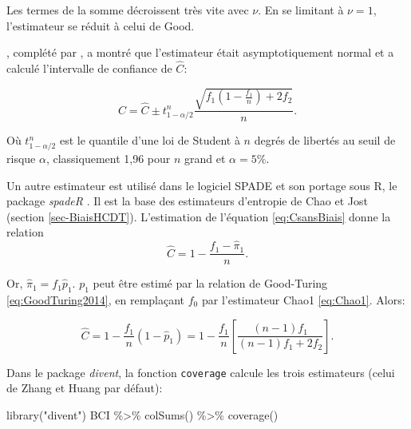 \documentclass[
  11pt,
  american,
  a4paper,
  extrafontsizes,onecolumn,openright
  ]{memoir}
\newenvironment{Shaded}{\begin{snugshade}}{\end{snugshade}}
\newcommand{\FunctionTok}[1]{\textcolor[rgb]{0.00,0.00,0.00}{#1}}
\newcommand{\NormalTok}[1]{#1}
\newcommand{\SpecialCharTok}[1]{\textcolor[rgb]{0.00,0.00,0.00}{#1}}
\newcommand{\StringTok}[1]{\textcolor[rgb]{0.31,0.60,0.02}{#1}}
\begin{document}
Les termes de la somme décroissent très vite avec \(\nu\).
En se limitant à \(\nu=1\), l'estimateur se réduit à celui de Good.

\textcite{Esty1983}, complété par \textcite{Zhang2009}, a montré que l'estimateur était asymptotiquement normal et a calculé l'intervalle de confiance de \(\hat{C}\):

\begin{equation}
  \label{eq:hatC}
  C = \hat{C} \pm t^{n}_{1 - \alpha / 2} \frac{\sqrt{f_1 \left( 1 - \frac{f_{1}}{n} \right) + 2f_2}}{n}.
\end{equation}

Où \(t^{n}_{1 - \alpha / 2}\) est le quantile d'une loi de Student à \(n\) degrés de libertés au seuil de risque \(\alpha\), classiquement 1,96 pour \(n\) grand et \(\alpha = 5\%\).

Un autre estimateur est utilisé dans le logiciel SPADE \autocite{Chao2010a} et son portage sous R, le package \emph{spadeR} \autocite{Chao2016c}.
Il est la base des estimateurs d'entropie de Chao et Jost (section \ref{sec-BiaisHCDT}).
L'estimation de l'équation \eqref{eq:CsansBiais} donne la relation
\begin{equation}
  \label{eq:hatC2}
  \hat{C} = 1 - \frac{f_{1} - \hat{\pi}_1}{n}.
\end{equation}

Or, \(\hat{\pi}_1 = f_{1} \hat{p}_1\).
\(p_1\) peut être estimé par la relation de Good-Turing \eqref{eq:GoodTuring2014}, en remplaçant \(f_0\) par l'estimateur Chao1 \eqref{eq:Chao1}.
Alors:

\begin{equation} 
  \label{eq:CChao}
  \hat{C} 
  = 1 - \frac{f_1}{n}(1 - \hat{p}_1)
  = 1 - \frac{f_1}{n}\left[ \frac{\left( n - 1 \right) f_1}{\left( n - 1 \right) f_1 + 2f_2} \right].
\end{equation}

Dans le package \emph{divent}, la fonction \texttt{coverage} calcule les trois estimateurs (celui de Zhang et Huang par défaut):

\scriptsize

\begin{Shaded}
\begin{Highlighting}[]
\FunctionTok{library}\NormalTok{(}\StringTok{"divent"}\NormalTok{)}
\NormalTok{BCI }\SpecialCharTok{\%\textgreater{}\%} 
  \FunctionTok{colSums}\NormalTok{() }\SpecialCharTok{\%\textgreater{}\%} 
  \FunctionTok{coverage}\NormalTok{()}
\end{Highlighting}
\end{Shaded}
\end{document}

